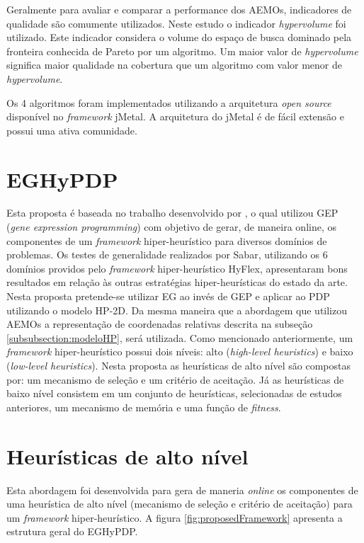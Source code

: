 Geralmente para avaliar e comparar a performance dos AEMOs, indicadores de qualidade são comumente utilizados. Neste estudo o indicador \textit{hypervolume} foi utilizado. Este indicador considera o volume do espaço de busca dominado pela fronteira conhecida de Pareto \cite{zitzler2003performance} por um algoritmo. Um maior valor de \textit{hypervolume} significa maior qualidade na cobertura que um algoritmo com valor menor de \textit{hypervolume}.

Os 4 algoritmos foram implementados utilizando a arquitetura \textit{open source} disponível no \textit{framework} jMetal. A arquitetura do jMetal é de fácil extensão e possui uma ativa comunidade.


\section{EGHyPDP}
\label{sec:eghypdp}

Esta proposta é baseada no trabalho desenvolvido por \cite{sabar2015automatic}, o qual  utilizou GEP (\textit{gene expression programming}) com objetivo de gerar, de maneira online, os componentes de um \textit{framework} hiper-heurístico para diversos domínios de problemas. Os testes de generalidade realizados por Sabar, utilizando os 6 domínios providos pelo \textit{framework} hiper-heurístico HyFlex, apresentaram bons resultados em relação às outras estratégias hiper-heurísticas do estado da arte. Nesta proposta pretende-se utilizar EG ao invés de GEP e aplicar ao PDP utilizando o modelo HP-2D. Da mesma maneira que a abordagem que utilizou  AEMOs a representação de coordenadas relativas descrita na subseção \ref{subsubsection:modeloHP}, será utilizada. Como mencionado anteriormente, um \textit{framework} hiper-heurístico possui dois níveis: alto (\textit{high-level heuristics}) e baixo (\textit{low-level heuristics}). Nesta proposta as heurísticas de alto nível são compostas por: um mecanismo de seleção e um critério de aceitação. Já as heurísticas de baixo nível consistem em um conjunto de heurísticas, selecionadas de estudos anteriores, um mecanismo de memória e uma função de \textit{fitness}. 

\section{Heurísticas de alto nível}
\label{sec:highlevelheuristics}
Esta abordagem  foi desenvolvida para gera de maneria \textit{online} os componentes de uma heurística de alto nível (mecanismo de seleção e critério de aceitação) para um \textit{framework} hiper-heurístico. A figura \ref{fig:proposedFramework} apresenta a estrutura geral do EGHyPDP. 

